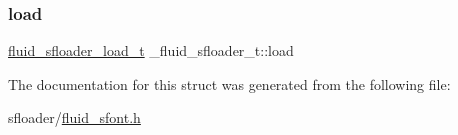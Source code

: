 \mbox{\label{struct__fluid__sfloader__t_ad0c3fd755c8c9a4333e7d0a15f50844f}} 
\subsubsection{\texorpdfstring{load}{load}}
{\footnotesize\ttfamily \hyperlink{sfont_8h_a4fce6413dd211799ce9716fe1b56b635}{fluid\+\_\+sfloader\+\_\+load\+\_\+t} \+\_\+fluid\+\_\+sfloader\+\_\+t\+::load}



The documentation for this struct was generated from the following file\+:\begin{DoxyCompactItemize}
\item 
sfloader/\hyperlink{fluid__sfont_8h}{fluid\+\_\+sfont.\+h}\end{DoxyCompactItemize}
